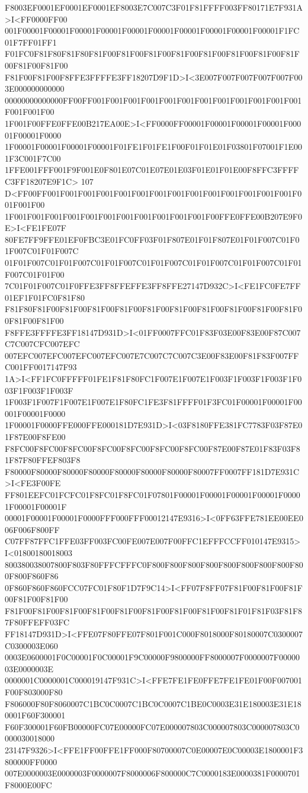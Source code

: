 F8003EF0001EF0001EF0001EF8003E7C007C3F01F81FFFF003FF80171E7F931A>I<FF0000FF00
001F00001F00001F00001F00001F00001F00001F00001F00001F00001F00001F1FC01F7FF01FF1
F01FC0F81F80F81F80F81F00F81F00F81F00F81F00F81F00F81F00F81F00F81F00F81F00F81F00
F81F00F81F00F8FFE3FFFFE3FF18207D9F1D>I<3E007F007F007F007F007F003E000000000000
00000000000000FF00FF001F001F001F001F001F001F001F001F001F001F001F001F001F001F00
1F001F00FFE0FFE00B217EA00E>I<FF0000FF00001F00001F00001F00001F00001F00001F0000
1F00001F00001F00001F00001F01FE1F01FE1F00F01F01E01F03801F07001F1E001F3C001F7C00
1FFE001FFF001F9F001E0F801E07C01E07E01E03F01E01F01E00F8FFC3FFFFC3FF18207E9F1C>
107 D<FF00FF001F001F001F001F001F001F001F001F001F001F001F001F001F001F001F001F00
1F001F001F001F001F001F001F001F001F001F001F001F00FFE0FFE00B207E9F0E>I<FE1FE07F
80FE7FF9FFE01EF0FBC3E01FC0FF03F01F807E01F01F807E01F01F007C01F01F007C01F01F007C
01F01F007C01F01F007C01F01F007C01F01F007C01F01F007C01F01F007C01F01F007C01F01F00
7C01F01F007C01F0FFE3FF8FFEFFE3FF8FFE27147D932C>I<FE1FC0FE7FF01EF1F01FC0F81F80
F81F80F81F00F81F00F81F00F81F00F81F00F81F00F81F00F81F00F81F00F81F00F81F00F81F00
F8FFE3FFFFE3FF18147D931D>I<01FF0007FFC01F83F03E00F83E00F87C007C7C007CFC007EFC
007EFC007EFC007EFC007EFC007E7C007C7C007C3E00F83E00F81F83F007FFC001FF0017147F93
1A>I<FF1FC0FFFFF01FE1F81F80FC1F007E1F007E1F003F1F003F1F003F1F003F1F003F1F003F
1F003F1F007F1F007E1F007E1F80FC1FE3F81FFFF01F3FC01F00001F00001F00001F00001F0000
1F00001F0000FFE000FFE000181D7E931D>I<03F8180FFE381FC7783F03F87E01F87E00F8FE00
F8FC00F8FC00F8FC00F8FC00F8FC00F8FC00F8FC00F87E00F87E01F83F03F81F87F80FFEF803F8
F80000F80000F80000F80000F80000F80000F80000F80007FF0007FF181D7E931C>I<FE3F00FE
FF801EEFC01FCFC01F8FC01F8FC01F07801F00001F00001F00001F00001F00001F00001F00001F
00001F00001F00001F0000FFF000FFF00012147E9316>I<0FF63FFE781EE00EE006F006F800FF
C07FF87FFC1FFE03FF003FC00FE007E007F00FFC1EFFFCCFF010147E9315>I<01800180018003
800380038007800F803F80FFFCFFFC0F800F800F800F800F800F800F800F800F800F800F860F86
0F860F860F860FCC07FC01F80F1D7F9C14>I<FF07F8FF07F81F00F81F00F81F00F81F00F81F00
F81F00F81F00F81F00F81F00F81F00F81F00F81F00F81F00F81F01F81F03F81F87F80FFEFF03FC
FF18147D931D>I<FFE07F80FFE07F801F001C000F8018000F80180007C0300007C0300003E060
0003E0600001F0C00001F0C00001F9C00000F9800000FF8000007F0000007F0000003E0000003E
0000001C0000001C000019147F931C>I<FFE7FE1FE0FFE7FE1FE01F00F007001F00F803000F80
F806000F80F8060007C1BC0C0007C1BC0C0007C1BE0C0003E31E180003E31E180001F60F300001
F60F300001F60FB00000FC07E00000FC07E000007803C000007803C000007803C0000030018000
23147F9326>I<FFE1FF00FFE1FF000F80700007C0E00007E0C00003E1800001F3800000FF0000
007E0000003E0000003F0000007F8000006F800000C7C0000183E0000381F0000701F8000E00FC
